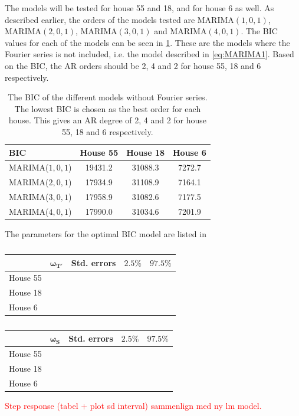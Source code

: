 \noindent The models will be tested for house 55 and 18, and for house 6 as well. As described earlier, the orders of the models tested are MARIMA$(1,0,1)$, MARIMA$(2,0,1)$, MARIMA$(3,0,1)$ and MARIMA$(4,0,1)$. The BIC values for each of the models can be seen in \cref{tab: BIC}. These are the models where the Fourier series is not included, i.e. the model described in \cref{eq:MARIMA1}. Based on the BIC, the AR orders should be 2, 4 and 2 for house 55, 18 and 6 respectively.
\begin{table}[H]
    \centering
    \begin{tabular}{l|ccc}
    \hline
    \textbf{BIC} & House 55 & House 18 & House 6 \\ \hline \hline
    MARIMA($1,0,1$) & 19431.2 & 31088.3 & 7272.7  \\
    MARIMA($2,0,1$) & 17934.9 & 31108.9 & 7164.1  \\
    MARIMA($3,0,1$) & 17958.9 & 31082.6 & 7177.5  \\
    MARIMA($4,0,1$) & 17990.0 & 31034.6 & 7201.9  \\
    \hline
    \end{tabular}
    \caption{The BIC of the different models without Fourier series. The lowest BIC is chosen as the best order for each house. This gives an AR degree of 2, 4 and 2 for house 55, 18 and 6 respectively.}
    \label{tab: BIC}
 \end{table}

The parameters for the optimal BIC model are listed in 










\begin{table}[H]
    \centering
    \begin{tabular}{l|cccc}
    \hline
     & $\bm{\omega_{T'}}$ & \textbf{Std. errors} & $\bm{2.5\%}$ & $\bm{97.5\%}$ \\ \hline \hline
    House 55 & & & & \\
    House 18 & & & & \\
    House 6 & & & & \\
    \hline
    \end{tabular}
    \caption{}
    \label{tab: result_temp}
 \end{table}

 \begin{table}[H]
    \centering
    \begin{tabular}{l|cccc}
    \hline
     & $\bm{\omega_S}$ & \textbf{Std. errors} & $\bm{2.5\%}$ & $\bm{97.5\%}$ \\ \hline \hline
    House 55 & & & & \\
    House 18 & & & & \\
    House 6 & & & & \\
    \hline
    \end{tabular}
    \caption{}
    \label{tab: result_solar}
 \end{table}


\textcolor{red}{Step response (tabel + plot sd interval)
sammenlign med ny lm model.}
